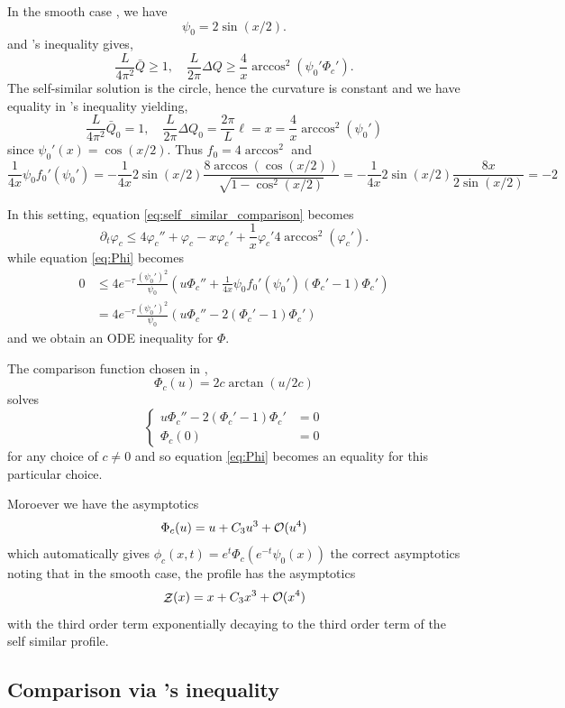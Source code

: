 \documentclass[11pt]{amsart}
\DeclareMathOperator{\chordarcprofile}{\mathcal{Z}}
\begin{document}
\begin{remark}
In the smooth case \cite{MR2794630}, we have
\[
\psi_0 = 2 \sin(x/2).
\]
and \holder's inequality gives,
\[
\frac{L}{4\pi^2} \bar{Q} \geq 1, \quad \frac{L}{2\pi} \Delta Q \geq \frac{4}{x} \arccos^2(\psi_0'\Phi_c').
\]
The self-similar solution is the circle, hence the curvature is constant and we have equality in \holder{}'s inequality yielding,
\[
\frac{L}{4\pi^2} \bar{Q}_0 = 1, \quad \frac{L}{2\pi} \Delta Q_0 = \frac{2\pi}{L} \ell = x = \frac{4}{x} \arccos^2(\psi_0')
\]
since $\psi_0'(x) = \cos(x/2)$. Thus $f_0 = 4 \arccos^2$ and
\[
\frac{1}{4x} \psi_0 f_0'(\psi_0') = - \frac{1}{4x} 2 \sin(x/2) \frac{8\arccos(\cos(x/2))}{\sqrt{1 - \cos^2(x/2)}} = - \frac{1}{4x} 2 \sin(x/2) \frac{8x}{2\sin(x/2)} = -2
\]

In this setting, equation \eqref{eq:self_similar_comparison} becomes
\[
\partial_t \varphi_c \leq 4 \varphi_c'' + \varphi_c - x\varphi_c' + \frac{1}{x} \varphi_c' 4\arccos^2(\varphi_c').
\]
while equation \eqref{eq:Phi} becomes
\[
\begin{split}
0 &\leq 4 e^{-\tau} \frac{(\psi_0')^2}{\psi_0} \left(u \Phi_c'' + \frac{1}{4x} \psi_0 f_0'(\psi_0')(\Phi_c' - 1) \Phi_c'\right) \\
&= 4 e^{-\tau} \frac{(\psi_0')^2}{\psi_0} \left(u \Phi_c'' - 2 (\Phi_c' - 1) \Phi_c'\right)
\end{split}
\]
and we obtain an ODE inequality for $\Phi$.

The comparison function chosen in \cite{MR2794630},
\[
\Phi_c (u) = 2 c \arctan(u/2c)
\]
solves
\[
\begin{cases}
u \Phi_c'' - 2 (\Phi_c' - 1) \Phi_c' &= 0 \\
\Phi_c(0) &= 0
\end{cases}
\]
for any choice of $c \ne 0$ and so equation \eqref{eq:Phi} becomes an equality for this particular choice.

Moroever we have the asymptotics
\[
\Phi_c(u) = u + C_3 u^3 + \operatorname{\mathcal{O}}(u^4)
\]
which automatically gives $\phi_c(x, t) = e^t \Phi_c (e^{-t} \psi_0(x))$ the correct asymptotics noting that in the smooth case, the profile has the asymptotics
\[
\chordarcprofile(x) = x + C_3 x^3 + \bigo(x^4)
\]
with the third order term exponentially decaying to the third order term of the self similar profile.
\end{remark}

\subsection{Comparison via \holder's inequality}
\end{document}
